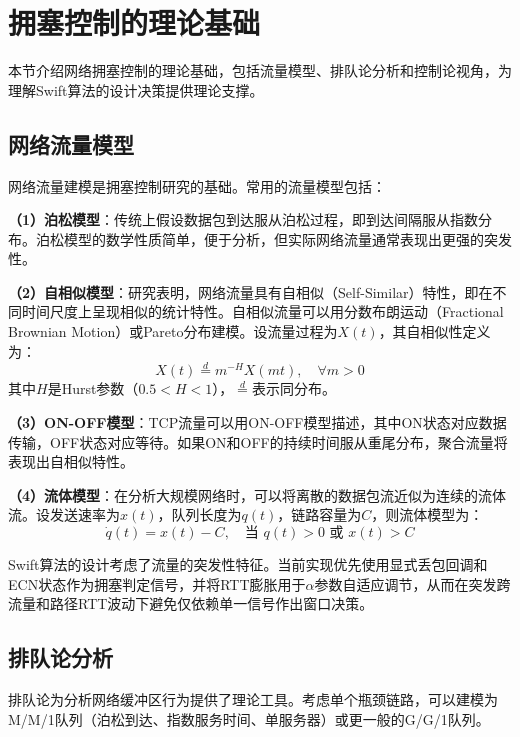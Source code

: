 \section{拥塞控制的理论基础}

本节介绍网络拥塞控制的理论基础，包括流量模型、排队论分析和控制论视角，为理解Swift算法的设计决策提供理论支撑。

\subsection{网络流量模型}

网络流量建模是拥塞控制研究的基础。常用的流量模型包括：

\textbf{（1）泊松模型}：传统上假设数据包到达服从泊松过程，即到达间隔服从指数分布。泊松模型的数学性质简单，便于分析，但实际网络流量通常表现出更强的突发性。

\textbf{（2）自相似模型}：研究表明，网络流量具有自相似（Self-Similar）特性，即在不同时间尺度上呈现相似的统计特性。自相似流量可以用分数布朗运动（Fractional Brownian Motion）或Pareto分布建模。设流量过程为$X(t)$，其自相似性定义为：
\begin{equation}
X(t) \stackrel{d}{=} m^{-H} X(mt), \quad \forall m > 0
\end{equation}
其中$H$是Hurst参数（$0.5 < H < 1$），$\stackrel{d}{=}$表示同分布。

\textbf{（3）ON-OFF模型}：TCP流量可以用ON-OFF模型描述，其中ON状态对应数据传输，OFF状态对应等待。如果ON和OFF的持续时间服从重尾分布，聚合流量将表现出自相似特性。

\textbf{（4）流体模型}：在分析大规模网络时，可以将离散的数据包流近似为连续的流体流。设发送速率为$x(t)$，队列长度为$q(t)$，链路容量为$C$，则流体模型为：
\begin{equation}
\dot{q}(t) = x(t) - C, \quad \text{当 } q(t) > 0 \text{ 或 } x(t) > C
\end{equation}

Swift算法的设计考虑了流量的突发性特征。当前实现优先使用显式丢包回调和ECN状态作为拥塞判定信号，并将RTT膨胀用于$\alpha$参数自适应调节，从而在突发跨流量和路径RTT波动下避免仅依赖单一信号作出窗口决策。

\subsection{排队论分析}

排队论为分析网络缓冲区行为提供了理论工具。考虑单个瓶颈链路，可以建模为M/M/1队列（泊松到达、指数服务时间、单服务器）或更一般的G/G/1队列。

